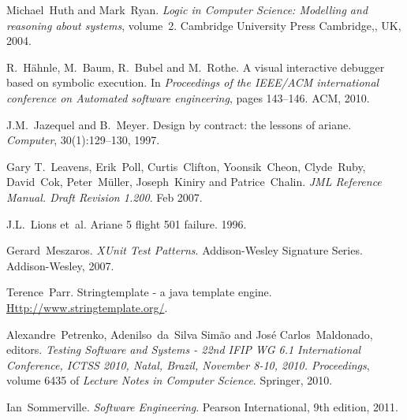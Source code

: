 \documentclass{article}
\newcommand{\tmtextit}[1]{{\itshape{#1}}}
\begin{document}
\begin{thebibliography}{10}
  Michael~Huth and Mark~Ryan.{\newblock}
  \tmtextit{Logic in Computer Science: Modelling and reasoning about systems},
  volume~2.{\newblock} Cambridge University Press Cambridge,, UK,
  2004.{\newblock}
  
  R.~H{\"a}hnle, M.~Baum, R.~Bubel and
  M.~Rothe.{\newblock} A visual interactive debugger based on symbolic
  execution.{\newblock} In \tmtextit{Proceedings of the IEEE/ACM international
  conference on Automated software engineering}, pages 143--146. ACM,
  2010.{\newblock}
  
  J.M.~Jazequel and B.~Meyer.{\newblock}
  Design by contract: the lessons of ariane.{\newblock} \tmtextit{Computer},
  30(1):129--130, 1997.{\newblock}
  
  Gary T.~Leavens, Erik~Poll, Curtis~Clifton,
  Yoonsik~Cheon, Clyde~Ruby, David~Cok, Peter~M{\"u}ller, Joseph~Kiniry and
  Patrice~Chalin.{\newblock} \tmtextit{JML Reference Manual. Draft Revision
  1.200}.{\newblock} Feb 2007.{\newblock}
  
  J.L.~Lions et~al.{\newblock} Ariane 5 flight
  501 failure.{\newblock} 1996.{\newblock}
  
  Gerard~Meszaros.{\newblock} \tmtextit{XUnit
  Test Patterns}.{\newblock} Addison-Wesley Signature Series. Addison-Wesley,
  2007.{\newblock}
  
  Terence~Parr.{\newblock} Stringtemplate -
  a java template engine.{\newblock}
  {\url{Http://www.stringtemplate.org/}}.{\newblock}
  
  Alexandre~Petrenko, Adenilso~da~Silva
  Sim{\~a}o and Jos{\'e} Carlos~Maldonado, editors.{\newblock}
  \tmtextit{Testing Software and Systems - 22nd IFIP WG 6.1 International
  Conference, ICTSS 2010, Natal, Brazil, November 8-10, 2010. Proceedings},
  volume 6435 of \tmtextit{Lecture Notes in Computer Science}.{\newblock}
  Springer, 2010.{\newblock}
  
  Ian~Sommerville.{\newblock}
  \tmtextit{Software Engineering}.{\newblock} Pearson International, 9th
  edition, 2011.{\newblock}
\end{thebibliography}
\end{document}
